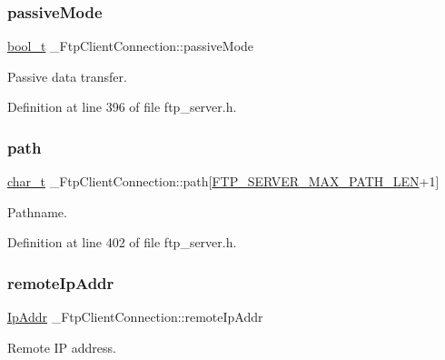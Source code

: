 \subsubsection{\texorpdfstring{passive\+Mode}{passiveMode}}
{\footnotesize\ttfamily \hyperlink{compiler__port_8h_a812d16e5494522586b3784e55d479912}{bool\+\_\+t} \+\_\+\+Ftp\+Client\+Connection\+::passive\+Mode}



Passive data transfer. 



Definition at line 396 of file ftp\+\_\+server.\+h.

\mbox{\label{struct__FtpClientConnection_a2361233b4c33bcc14ac17f6b4029054f}} 
\subsubsection{\texorpdfstring{path}{path}}
{\footnotesize\ttfamily \hyperlink{compiler__port_8h_a40bb5262bf908c328fbcfbe5d29d0201}{char\+\_\+t} \+\_\+\+Ftp\+Client\+Connection\+::path\mbox{[}\hyperlink{ftp__server_8h_ade570d175c68d8272bc482bf337af10f}{F\+T\+P\+\_\+\+S\+E\+R\+V\+E\+R\+\_\+\+M\+A\+X\+\_\+\+P\+A\+T\+H\+\_\+\+L\+EN}+1\mbox{]}}



Pathname. 



Definition at line 402 of file ftp\+\_\+server.\+h.

\mbox{\label{struct__FtpClientConnection_a76381be2a3bff01d89c4cdabc2cdafd8}} 
\subsubsection{\texorpdfstring{remote\+Ip\+Addr}{remoteIpAddr}}
{\footnotesize\ttfamily \hyperlink{structIpAddr}{Ip\+Addr} \+\_\+\+Ftp\+Client\+Connection\+::remote\+Ip\+Addr}



Remote IP address. 




